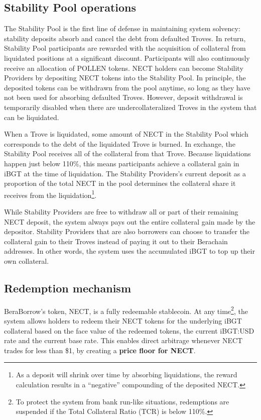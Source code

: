 \documentclass{article}
\begin{document}
\subsection{Stability Pool operations}
The Stability Pool is the first line of defense in maintaining system solvency: stability deposits absorb and cancel the debt from defaulted Troves. In return, Stability Pool participants are rewarded with the acquisition of collateral from liquidated positions at a significant discount. Participants will also continuously receive an allocation of POLLEN tokens.
NECT holders can become Stability Providers by depositing NECT tokens into the Stability Pool. In principle, the deposited tokens can be withdrawn from the pool anytime, so long as they have not been used for absorbing defaulted Troves. However, deposit withdrawal is temporarily disabled when there are undercollateralized Troves in the system that can be liquidated.

When a Trove is liquidated, some amount of NECT in the Stability Pool which corresponds to the debt of the liquidated Trove is burned. In exchange, the Stability Pool receives all of the collateral from that Trove. Because liquidations happen just below 110\%, this means participants achieve a collateral gain in iBGT at the time of liquidation. The Stability Providers’s current deposit as a proportion of the total NECT in the pool determines the collateral share it receives from the liquidation\footnote{As a deposit will shrink over time by absorbing liquidations, the reward calculation results in a “negative” compounding of the deposited NECT.}. 

While Stability Providers are free to withdraw all or part of their remaining NECT deposit, the system always pays out the entire collateral gain made by the depositor. Stability Providers that are also borrowers can choose to transfer the collateral gain to their Troves instead of paying it out to their Berachain addresses. In other words, the system uses the accumulated iBGT to top up their own collateral. 

\subsection{Redemption mechanism}
BeraBorrow’s token, NECT, is a fully redeemable stablecoin. At any time\footnote{To protect the system from bank run-like situations, redemptions are suspended if the Total Collateral Ratio (TCR) is below 110\%.}, the system allows holders to redeem their NECT tokens for the underlying iBGT collateral based on the face value of the redeemed tokens, the current iBGT:USD rate and the current base rate. This enables direct arbitrage whenever NECT trades for less than \$1, by creating a \textbf{price floor for NECT}.\\
\end{document}
